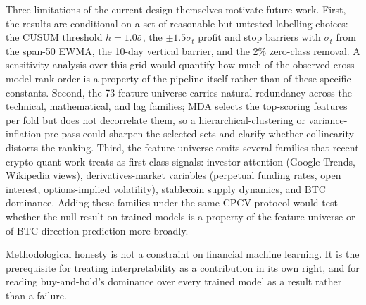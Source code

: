 Three limitations of the current design themselves motivate future work. First, the results are conditional on a set of reasonable but untested labelling choices: the CUSUM threshold $h = 1.0\bar{\sigma}$, the $\pm 1.5\sigma_t$ profit and stop barriers with $\sigma_t$ from the span-50 EWMA, the 10-day vertical barrier, and the 2\% zero-class removal. A sensitivity analysis over this grid would quantify how much of the observed cross-model rank order is a property of the pipeline itself rather than of these specific constants. Second, the 73-feature universe carries natural redundancy across the technical, mathematical, and lag families; MDA selects the top-scoring features per fold but does not decorrelate them, so a hierarchical-clustering or variance-inflation pre-pass could sharpen the selected sets and clarify whether collinearity distorts the ranking. Third, the feature universe omits several families that recent crypto-quant work treats as first-class signals: investor attention (Google Trends, Wikipedia views), derivatives-market variables (perpetual funding rates, open interest, options-implied volatility), stablecoin supply dynamics, and BTC dominance. Adding these families under the same CPCV protocol would test whether the null result on trained models is a property of the feature universe or of BTC direction prediction more broadly.

Methodological honesty is not a constraint on financial machine learning. It is the prerequisite for treating interpretability as a contribution in its own right, and for reading buy-and-hold's dominance over every trained model as a result rather than a failure.